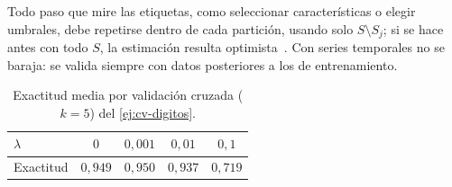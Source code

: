 \begin{observacion}
Todo paso que mire las etiquetas, como seleccionar características o elegir umbrales, debe repetirse dentro de cada partición, usando solo $S\setminus S_j$; si se hace antes con todo $S$, la estimación resulta optimista~\cite[§7.10.2]{esl}. Con series temporales no se baraja: se valida siempre con datos posteriores a los de entrenamiento.
\end{observacion}

\addtocounter{definicion}{1}%

\begin{table}[h]
\centering\small
\caption{Exactitud media por validación cruzada ($k=5$) del \cref{ej:cv-digitos}.}\label{tab:cv}
\begin{tabular}{@{}lcccc@{}}
\toprule
$\lambda$ & $0$ & $0{,}001$ & $0{,}01$ & $0{,}1$ \\
\midrule
Exactitud & $0{,}949$ & $0{,}950$ & $0{,}937$ & $0{,}719$ \\
\bottomrule
\end{tabular}
\end{table}

\addtocounter{definicion}{1}%

